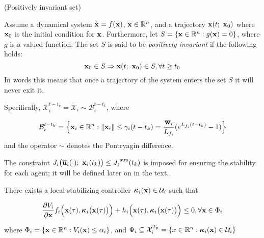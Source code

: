 \begin{bw_box}
  \begin{definition} (Positively invariant set)

    Assume a dynamical system $\dot{\bm{\mathbf{x}}} = f(\bm{\mathbf{x}})$,
    $\bm{\mathbf{x}} \in \mathbb{R}^n$, and a trajectory $\bm{\mathbf{x}}(t;\ \bm{\mathbf{x}}_0)$
    where $\bm{\mathbf{x}}_0$ is the initial condition for $\bm{\mathbf{x}}$. Furthermore,
    let $S = \{\bm{\mathbf{x}} \in \mathbb{R}^n : g(\bm{\mathbf{x}}) = 0\}$, where $g$ is
    a valued function. The set $S$ is said to be \textit{positively invariant}
    if the following holds:
    $$\vect{x}_0 \in S \Rightarrow \vect{x}(t;\ \vect{x}_0) \in S, \forall t \geq t_0$$
    In words this means that once a trajectory of the system enters the set $S$
    it will never exit it.
  \end{definition}
\end{bw_box}

Specifically,
$\mathcal{X}_i^{t - t_k} = \mathcal{X}_i \sim \mathcal{B}_i^{t-t_k}$, where

\begin{align}
  \mathcal{B}_i^{t-t_k} =
  \Big\{\bm{\mathbf{x}}_i \in \mathbb{R}^n : \|\bm{\mathbf{x}}_i\| \leq \gamma_i (t-t_k) = \frac{\overline{\bm{\mathbf{w}}}_i}{L_{f_i}} (e^{L_{f_i} (t-t_k)} - 1) \Big\}
\end{align}
and the operator $\sim$ denotes the Pontryagin difference.

The constraint $J_i \big(\overline{\bm{\mathbf{u}}}_i (\cdot);\ \bm{\mathbf{x}}_i(t_k)\big) \leq J_i^{\text{ sup}}(t_k)$
is imposed for ensuring the stability for each agent; it will be defined later
on in the text.

\begin{gg_box}
\begin{assumption}

  There exists a local stabilizing controller
  $\bm{\mathbf{\kappa}}_i(\bm{\mathbf{x}}) \in \mathcal{U}_i$ such that

  \begin{align}
    \dfrac{\partial V_i}{\partial \bm{\mathbf{x}}} f_i \Big(\bm{\mathbf{x}}(\tau), \bm{\mathbf{\kappa}}_i\big(\bm{\mathbf{x}}(\tau)\big)\Big) +
      h_i\Big(\bm{\mathbf{x}}(\tau), \bm{\mathbf{\kappa}}_i \big(\bm{\mathbf{x}}(\tau)\big)\Big) \leq 0, \forall \bm{\mathbf{x}} \in \Phi_i
  \end{align}

  where $\Phi_i = \{\bm{\mathbf{x}} \in \mathbb{R}^n : V_i(\bm{\mathbf{x}}) \leq \alpha_i \}$, and
  $\Phi_i \subseteq \mathcal{X}_i^{T_p} = \{x \in \mathbb{R}^n : \bm{\mathbf{\kappa}}_i(\bm{\mathbf{x}}) \in \mathcal{U}_i\}$

  \label{ass:local_controller_k}
\end{assumption}
\end{gg_box}


